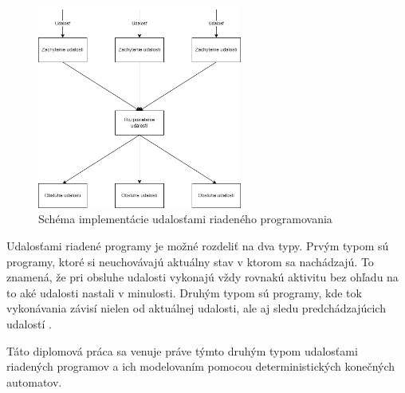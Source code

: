 \begin{figure}[!htbp]
  \centering
  \includegraphics[width=0.60\textwidth]{img/event-driven-schema.png}
  \caption{Schéma implementácie udalosťami riadeného programovania}
  \label{figure:event-driven-schema}
\end{figure}

\par
Udalosťami riadené programy je možné rozdeliť na dva typy. Prvým typom sú programy, ktoré si neuchovávajú aktuálny stav v ktorom sa nachádzajú. To znamená, že pri obsluhe udalosti vykonajú vždy rovnakú aktivitu bez ohľadu na to aké udalosti nastali v minulosti. Druhým typom sú programy, kde tok vykonávania závisí nielen od aktuálnej udalosti, ale aj sledu predchádzajúcich udalostí \cite{dashEventDrivenProgramming2011}. 
\par Táto diplomová práca sa venuje práve týmto druhým typom udalosťami riadených programov a ich modelovaním pomocou deterministických konečných automatov.